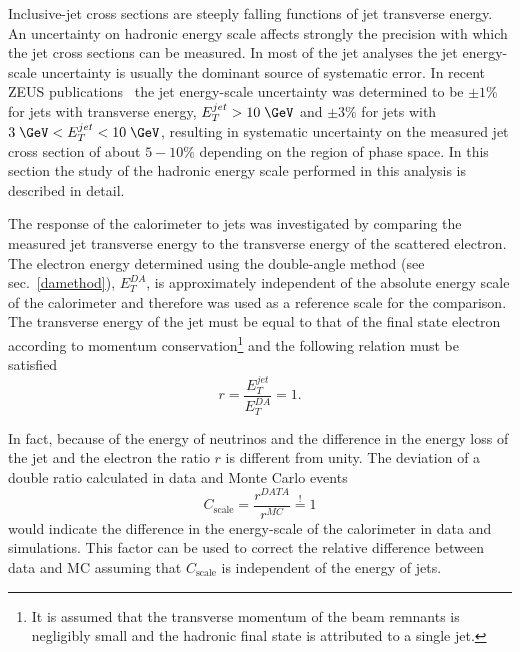 Inclusive-jet cross sections are steeply falling functions of jet transverse energy. An uncertainty on hadronic energy scale affects strongly the precision with which the jet cross sections can be measured. In most of the jet analyses the jet energy-scale uncertainty is usually the dominant source of systematic error. In recent ZEUS publications~\cite{epj:c70:965, np:b864:1} the jet energy-scale uncertainty was determined to be $\pm 1\%$ for jets with transverse energy, $\etjet>10\; \GeV$ and $\pm 3\%$ for jets with $3\; \GeV<\etjet < 10\; \GeV$, resulting in systematic uncertainty on the measured jet cross section of about $5-10\%$ depending on the region of phase space. In this section the study of the hadronic energy scale performed in this analysis is described in detail.

The response of the calorimeter to jets was investigated by comparing the measured jet transverse energy to the transverse energy of the scattered electron. The electron energy determined using the double-angle method (see sec.~\ref{damethod}), $E_T^{DA}$, is approximately independent of the absolute energy scale of the calorimeter and therefore was used as a reference scale for the comparison. The transverse energy of the jet must be equal to that of the final state electron according to momentum conservation\footnote{It is assumed that the transverse momentum of the beam remnants is negligibly small and the hadronic final state is attributed to a single jet.} and the following relation must be satisfied
\begin{equation}
r = \frac{E_T^{jet}}{E_T^{DA}} = 1.
\label{eq:etjetetelbalance}
\end{equation}

In fact, because of the energy of neutrinos and the difference in the energy loss of the jet and the electron the ratio $r$ is different from unity. The deviation of a double ratio calculated in data and Monte Carlo events
\begin{equation}
C_\text{scale} = \frac{r^{DATA}}{r^{MC}} \stackrel{!}{=} 1
\label{eq:cscale}
\end{equation}
would indicate the difference in the energy-scale of the calorimeter in data and simulations. This factor can be used to correct the relative difference between data and MC assuming that $C_\text{scale}$ is independent of the energy of jets. 

